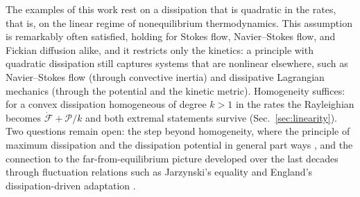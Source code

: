 \documentclass[aip,pof,reprint,amsmath,amssymb,longbibliography]{revtex4-2}
\begin{document}
The examples of this work rest on a dissipation that is quadratic in the rates, that is, on the linear regime of nonequilibrium thermodynamics. This assumption is remarkably often satisfied, holding for Stokes flow, Navier--Stokes flow, and Fickian diffusion \cite{flachberger2024} alike, and it restricts only the kinetics: a principle with quadratic dissipation still captures systems that are nonlinear elsewhere, such as Navier--Stokes flow (through convective inertia) and dissipative Lagrangian mechanics (through the potential and the kinetic metric). Homogeneity suffices: for a convex dissipation homogeneous of degree $k > 1$ in the rates the Rayleighian becomes $\dot{\mathcal{F}} + \mathcal{P}/k$ and both extremal statements survive (Sec.~\ref{sec:linearity}). Two questions remain open: the step beyond homogeneity, where the principle of maximum dissipation and the dissipation potential in general part ways \cite{hackl2008}, and the connection to the far-from-equilibrium picture developed over the last decades through fluctuation relations such as Jarzynski's equality \cite{jarzynski1997} and England's dissipation-driven adaptation \cite{england2013}.
\end{document}
